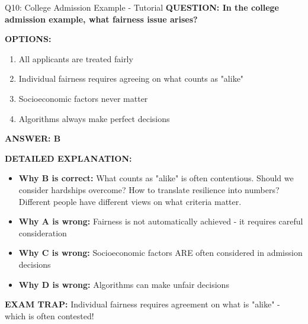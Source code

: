 \documentclass[8pt]{beamer}
\begin{document}
	\begin{frame}{Q10: College Admission Example - Tutorial}
		\fontsize{6.5}{7.5}\selectfont
		\textbf{QUESTION: In the college admission example, what fairness issue arises?}
		
		\vspace{0.1cm}
		\textbf{OPTIONS:}
		\begin{enumerate}
			\item All applicants are treated fairly
			\item Individual fairness requires agreeing on what counts as "alike"
			\item Socioeconomic factors never matter
			\item Algorithms always make perfect decisions
		\end{enumerate}
		
		\vspace{0.1cm}
		\textcolor{myblue}{\textbf{ANSWER: B}}
		
		\vspace{0.1cm}
		\textbf{DETAILED EXPLANATION:}
		\begin{itemize}
			\item \textbf{Why B is correct:} What counts as "alike" is often contentious. Should we consider hardships overcome? How to translate resilience into numbers? Different people have different views on what criteria matter.
			\item \textbf{Why A is wrong:} Fairness is not automatically achieved - it requires careful consideration
			\item \textbf{Why C is wrong:} Socioeconomic factors ARE often considered in admission decisions
			\item \textbf{Why D is wrong:} Algorithms can make unfair decisions
		\end{itemize}
		
		\textcolor{myred}{\textbf{EXAM TRAP:}} Individual fairness requires \textcolor{myblue}{agreement on what is "alike"} - which is often contested!
	\end{frame}
	
\end{document}
